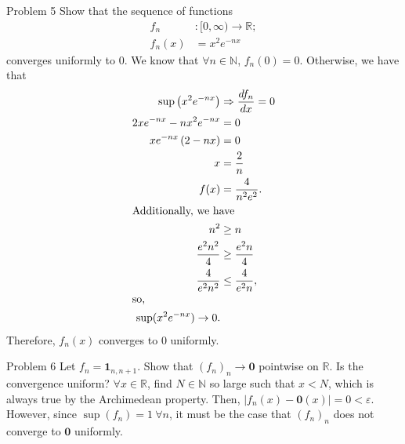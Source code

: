 \documentclass[8pt]{extarticle}
\renewcommand{\mathbf}[1]{\mathbold{#1}}
\newcommand{\N}{\mathbb{N}}
\newcommand{\R}{\mathbb{R}}
\begin{document}
  \begin{problem}{Problem 5}
    Show that the sequence of functions
    \begin{align*}
      f_n&: [0,\infty) \rightarrow \R;\\
      f_n(x) &= x^2e^{-nx}
    \end{align*}
    converges uniformly to $0$.
    \tcblower
    We know that $\forall n\in\N$, $f_n(0) = 0$. Otherwise, we have that
    \begin{align*}
      \sup\left(x^2e^{-nx}\right) &\Rightarrow \frac{df_n}{dx} = 0\\
      2xe^{-nx} - nx^2e^{-nx} &= 0\\
      xe^{-nx}\left(2-nx\right) &= 0\\
      x &= \frac{2}{n}\\
      f(x) &= \frac{4}{n^2e^2}.\\
      \shortintertext{Additionally, we have}
      n^2 &\geq n\\
      \frac{e^2n^2}{4} &\geq \frac{e^2n}{4}\\
      \frac{4}{e^2n^2} &\leq \frac{4}{e^2n},\\
      \shortintertext{so,}
      \sup(x^2e^{-nx}) \rightarrow 0.
    \end{align*}
    Therefore, $f_n(x)$ converges to $0$ uniformly.
  \end{problem}
  \begin{problem}{Problem 6}
    Let $f_n = \mathbf{1}_{n,n+1}$. Show that $(f_n)_n \rightarrow \mathbf{0}$ pointwise on $\R$. Is the convergence uniform?
    \tcblower
    $\forall x\in\R$, find $N\in\N$ so large such that $x < N$, which is always true by the Archimedean property. Then, $|f_n(x) - \mathbf{0}(x)| = 0 < \varepsilon$.\\

    However, since $\sup(f_n) = 1~\forall n$, it must be the case that $(f_n)_n$ does not converge to $\mathbf{0}$ uniformly.
  \end{problem}
\end{document}
